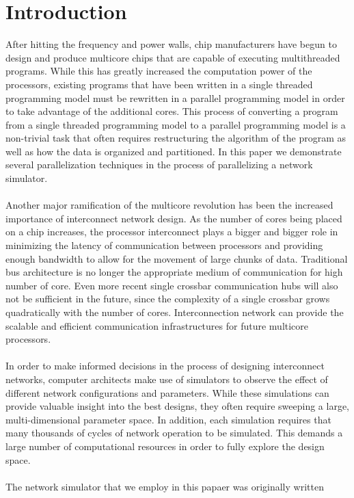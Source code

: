 \documentclass[twocolumn]{article}
\begin{document}
\section{Introduction}
After hitting the frequency and power walls, chip manufacturers have begun
to design and produce multicore chips that are capable of executing
multithreaded programs.  While this has greatly increased the computation power of the processors, existing programs that have been
written in a single threaded programming model must be rewritten in a
parallel programming model in order to take advantage of the additional cores.  This process of converting a program from a single threaded
programming model to a parallel programming model is a non-trivial task
that often requires restructuring the algorithm of the program as well as
how the data is organized and partitioned.  In this paper we demonstrate
several parallelization techniques in the process of parallelizing a
network simulator.\\
~\\
Another major ramification of the multicore revolution has been the
increased importance of interconnect network design.  As the number of
cores being placed on a chip increases, the processor interconnect plays a bigger and
bigger role in minimizing the latency of communication between processors
and providing enough bandwidth to allow for the movement of large chunks
of data. Traditional bus architecture is no longer the appropriate medium of communication for high number of core. Even more recent single crossbar communication hubs will also not be sufficient in the future, since the complexity of a single crossbar grows quadratically with the number of cores. Interconnection network can provide the scalable and efficient communication
infrastructures for future multicore processors. \\
~\\
In order to make informed decisions in the process of designing
interconnect networks, computer architects make use of simulators to
observe the effect of different network configurations and parameters.  While
these simulations can provide valuable insight into the best designs, they
often require sweeping a large, multi-dimensional parameter space.  In
addition, each simulation requires that many thousands of cycles
of network operation to be simulated.  This demands a large number of computational
resources in order to fully explore the design space.\\
~\\
The network simulator that we employ in this papaer was originally written
\end{document}
